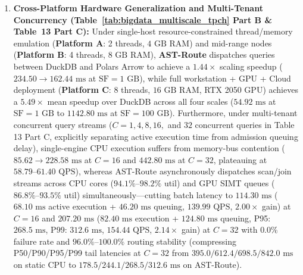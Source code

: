 \documentclass[10pt,a4paper]{article}
\begin{document}
\begin{enumerate}[leftmargin=1.5em,itemsep=2pt]
    \item \textbf{Cross-Platform Hardware Generalization and Multi-Tenant Concurrency (Table~\ref{tab:bigdata_multiscale_tpch} Part B \& Table~13 Part C):} Under single-host resource-constrained thread/memory emulation (\textbf{Platform A}: 2 threads, $4\text{ GB}$ RAM) and mid-range nodes (\textbf{Platform B}: 4 threads, $8\text{ GB}$ RAM), \textbf{AST-Route} dispatches queries between DuckDB and Polars Arrow to achieve a $1.44\times$ scaling speedup ($234.50 \rightarrow 162.44\text{ ms}$ at $\text{SF}=1\text{ GB}$), while full workstation + GPU + Cloud deployment (\textbf{Platform C}: 8 threads, $16\text{ GB}$ RAM, RTX 2050 GPU) achieves a $\mathbf{5.49\times}$ mean speedup over DuckDB across all four scales ($54.92\text{ ms}$ at $\text{SF}=1\text{ GB}$ to $1142.80\text{ ms}$ at $\text{SF}=100\text{ GB}$). Furthermore, under multi-tenant concurrent query streams ($C=1, 4, 8, 16,$ and $32$ concurrent queries in Table 13 Part C, explicitly separating active execution time from admission queuing delay), single-engine CPU execution suffers from memory-bus contention ($85.62 \rightarrow 228.58\text{ ms}$ at $C=16$ and $442.80\text{ ms}$ at $C=32$, plateauing at $58.79\text{--}61.40\text{ QPS}$), whereas AST-Route asynchronously dispatches scan/join streams across CPU cores ($94.1\%\text{--}98.2\%$ util) and GPU SIMT queues ($86.8\%\text{--}93.5\%$ util) simultaneously---cutting batch latency to $114.30\text{ ms}$ ($68.10\text{ ms}$ active execution + $46.20\text{ ms}$ queuing, $139.99\text{ QPS}$, $2.00\times$ gain) at $C=16$ and $207.20\text{ ms}$ ($82.40\text{ ms}$ execution + $124.80\text{ ms}$ queuing, P95: $268.5\text{ ms}$, P99: $312.6\text{ ms}$, $154.44\text{ QPS}$, $2.14\times$ gain) at $C=32$ with $0.0\%$ failure rate and $96.0\%\text{--}100.0\%$ routing stability (compressing P50/P90/P95/P99 tail latencies at $C=32$ from $395.0/612.4/698.5/842.0\text{ ms}$ on static CPU to $178.5/244.1/268.5/312.6\text{ ms}$ on AST-Route).

\end{enumerate}
\end{document}
